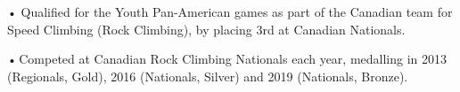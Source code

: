 \documentclass[]{resume}
\begin{document}
\begin{minipage}[t]{0.66\textwidth}
 
\descript{}
\noindent
\hspace{3em}%
\begin{minipage}{0.85\textwidth\vspace{2pt}}
• Qualified for the Youth Pan-American games as part of the Canadian team for Speed Climbing (Rock Climbing), by placing 3rd at Canadian Nationals. 
\end{minipage}
\sectionsep

 
\descript{}
\noindent
\hspace{3em}%
\begin{minipage}{0.85\textwidth\vspace{2pt}}
•\,Competed at Canadian Rock Climbing Nationals each year, medalling in 2013 (Regionals, Gold), 2016 (Nationals, Silver) and 2019 (Nationals, Bronze). 
\end{minipage}
\sectionsep

\end{minipage} 
\end{document}
